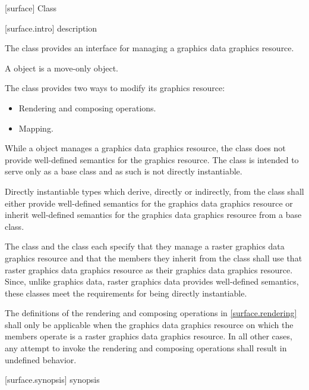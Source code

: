  [surface] {Class }

 [surface.intro] { description}

\pnum
{}
The  class provides an interface for managing a graphics
data graphics resource.

\pnum
A  object is a move-only object.

\pnum
The  class provides two ways to modify its graphics resource:
\begin{itemize}
	\item Rendering and composing operations.
	\item Mapping.
\end{itemize}

\pnum
\enternote
While a  object manages a graphics data graphics resource, the  class does not provide well-defined semantics for the graphics resource. The  class is intended to serve only as a base class and as such is not directly instantiable.
\exitnote

\pnum
Directly instantiable types which derive, directly or indirectly, from the  class shall either provide well-defined semantics for the graphics data graphics resource or inherit well-defined semantics for the graphics data graphics resource from a base class.

\pnum
\enterexample
The  class and the  class each specify that they manage a raster graphics data graphics resource and that the members they inherit from the  class shall use that raster graphics data graphics resource as their graphics data graphics resource. Since, unlike graphics data, raster graphics data provides well-defined semantics, these classes meet the requirements for being directly instantiable.
\exitexample

\pnum
The definitions of the rendering and composing operations in \ref{surface.rendering} shall only be applicable when the graphics data graphics resource on which the  members operate is a raster graphics data graphics resource. In all other cases, any attempt to invoke the rendering and composing operations shall result in undefined behavior.

 [surface.synopsis] { synopsis}

